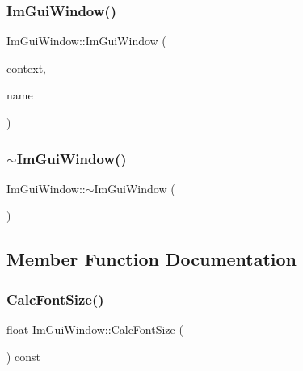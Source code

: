 \subsubsection{\texorpdfstring{Im\+Gui\+Window()}{ImGuiWindow()}}
{\footnotesize\ttfamily Im\+Gui\+Window\+::\+Im\+Gui\+Window (\begin{DoxyParamCaption}\item[{\hyperlink{struct_im_gui_context}{Im\+Gui\+Context} $\ast$}]{context,  }\item[{const char $\ast$}]{name }\end{DoxyParamCaption})}

\hypertarget{struct_im_gui_window_a8e81d730c3a39a71e6b6ca4654451c53}{}\label{struct_im_gui_window_a8e81d730c3a39a71e6b6ca4654451c53} 
\subsubsection{\texorpdfstring{$\sim$\+Im\+Gui\+Window()}{~ImGuiWindow()}}
{\footnotesize\ttfamily Im\+Gui\+Window\+::$\sim$\+Im\+Gui\+Window (\begin{DoxyParamCaption}{ }\end{DoxyParamCaption})}



\subsection{Member Function Documentation}
\hypertarget{struct_im_gui_window_a6881ed65e208fb6e015d3ae6bccfc794}{}\label{struct_im_gui_window_a6881ed65e208fb6e015d3ae6bccfc794} 
\subsubsection{\texorpdfstring{Calc\+Font\+Size()}{CalcFontSize()}}
{\footnotesize\ttfamily float Im\+Gui\+Window\+::\+Calc\+Font\+Size (\begin{DoxyParamCaption}{ }\end{DoxyParamCaption}) const}

\hypertarget{struct_im_gui_window_a66400a63bc0b54d7d29e08d1b1b1a42b}{}\label{struct_im_gui_window_a66400a63bc0b54d7d29e08d1b1b1a42b} 
